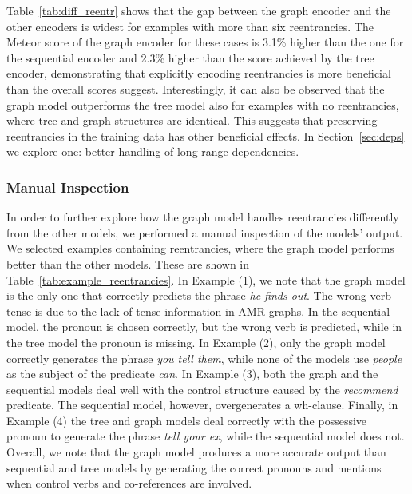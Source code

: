 \documentclass[11pt,a4paper]{article}
\begin{document}
Table~\ref{tab:diff_reentr} shows that the gap between the graph encoder and the other encoders is widest for examples with more than six reentrancies. The Meteor score of the graph encoder for these cases is 3.1\% higher than the one for the sequential encoder and 2.3\% higher than the score achieved by the tree encoder, demonstrating that explicitly encoding reentrancies is more beneficial than the overall scores suggest. Interestingly, it can also be observed that the graph model outperforms the tree model also for examples with no reentrancies, where tree and graph structures are identical. This suggests that preserving reentrancies in the training data has other beneficial effects. In Section~\ref{sec:deps} we explore one: better handling of long-range dependencies.




\subsubsection{Manual Inspection}

In order to further explore how the graph model handles reentrancies differently from the other models, we performed a manual inspection of the models' output. We selected examples containing reentrancies, where the graph model performs better than the other models. These are shown in Table~\ref{tab:example_reentrancies}. In Example (1), we note that the graph model is the only one that correctly predicts the phrase \emph{he finds out}. The wrong verb tense is due to the lack of tense information in AMR graphs. In the sequential model, the pronoun is chosen correctly, but the wrong verb is predicted, while in the tree model the pronoun is missing. In Example (2), only the graph model correctly generates the phrase \emph{you tell them}, while none of the models use \emph{people} as the subject of the predicate \emph{can}. In Example (3), both the graph and the sequential models deal well with the control structure caused by the \emph{recommend} predicate. The sequential model, however, overgenerates a wh-clause. Finally, in Example (4) the tree and graph models deal correctly with the possessive pronoun to generate the phrase \emph{tell your ex}, while the sequential model does not. Overall, we note that the graph model produces a more accurate output than sequential and tree models by generating the correct pronouns and mentions when control verbs and co-references are involved. 
\end{document}
